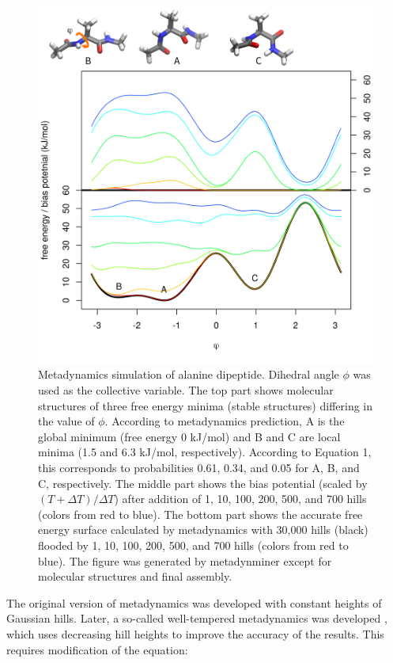\begin{Schunk}
\begin{figure}

{\centering \includegraphics[width=0.8\linewidth]{fig1} 

}

\caption[Metadynamics simulation of alanine dipeptide]{Metadynamics simulation of alanine dipeptide. Dihedral angle $\phi$ was used as the collective variable. The top part shows molecular structures of three free energy minima (stable structures) differing in the value of $\phi$. According to metadynamics prediction, A is the global minimum (free energy 0 kJ/mol) and B and C are local minima (1.5 and 6.3 kJ/mol, respectively). According to Equation 1, this corresponds to probabilities 0.61, 0.34, and 0.05 for A, B, and C, respectively. The middle part shows the bias potential (scaled by $(T+\Delta T)/\Delta T$) after addition of 1, 10, 100, 200, 500, and 700 hills (colors from red to blue). The bottom part shows the accurate free energy surface calculated by metadynamics with 30,000 hills (black) flooded by 1, 10, 100, 200, 500, and 700 hills (colors from red to blue). The figure was generated by metadynminer except for molecular structures and final assembly.}\label{fig:Metadynamics}
\end{figure}
\end{Schunk}

The original version of metadynamics was developed with constant heights
of Gaussian hills. Later, a so-called well-tempered metadynamics was
developed \citep{wtmtd}, which uses decreasing hill heights to improve
the accuracy of the results. This requires modification of the equation:

